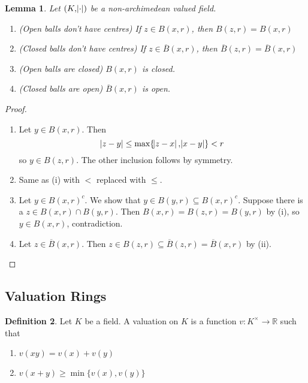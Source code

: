 \documentclass[11pt]{article}
\theoremstyle{definition}
\newtheorem{definition}{Definition}[subsection]
\theoremstyle{plain}
\newtheorem{lemma}[definition]{Lemma}
\theoremstyle{remark}
\newcommand{\bR}{\mathbb{R}}
\begin{document}
\begin{lemma}\label{lem:1_8}
    Let $(K, \abs{\cdot})$ be a non-archimedean valued field.
    \begin{enumerate}
        \item (Open balls don't have centres) If $z \in B(x, r)$, then $B(z, r) = B(x, r)$
        \item (Closed balls don't have centres) If $z \in \overline{B}(x, r)$, then $\overline{B}(z, r) = \overline{B}(x, r)$
        \item (Open balls are closed) $B(x, r)$ is closed.
        \item (Closed balls are open) $\overline{B}(x, r)$ is open.
    \end{enumerate}
\end{lemma}
\begin{proof}\phantom{}
    \begin{enumerate}
        \item Let $y \in B(x, r)$. Then
            \begin{equation*}
                \abs{z - y} \le \max\{\abs{z-x}, \abs{x-y}\} < r
            \end{equation*}
            so $y \in B(z, r)$. The other inclusion follows by symmetry.
        \item Same as (i) with $<$ replaced with $\le$.
        \item Let $y \in B(x, r)^c$. We show that $y \in B(y, r) \subseteq B(x, r)^c$. Suppose there is a $z \in B(x, r) \cap B(y, r)$. Then $B(x, r) = B(z, r) = B(y, r)$ by (i), so $y \in B(x, r)$, contradiction.
        \item Let $z \in \overline{B}(x, r)$. Then $z \in B(z, r) \subseteq \overline{B}(z, r) = \overline{B}(x, r)$ by (ii). \qedhere
    \end{enumerate}
\end{proof}

\subsection{Valuation Rings}

\begin{definition}
    Let $K$ be a field. A valuation on $K$ is a function $v : K^\times \to \bR$ such that
    \begin{enumerate}
        \item $v(xy) = v(x) + v(y)$
        \item $v(x + y) \ge \min\{v(x), v(y)\}$
    \end{enumerate}
\end{definition}
\end{document}
